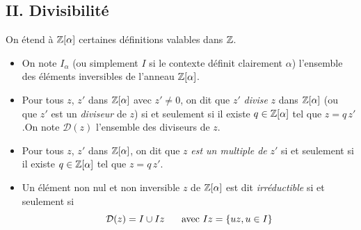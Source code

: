 \subsection*{II. Divisibilité}
On étend à $\mathbb{Z}[\alpha]$ certaines définitions valables dans $\mathbb{Z}$.
\begin{itemize}
  \item On note $I_\alpha$ (ou simplement $I$ si le contexte définit clairement $\alpha$) l'ensemble des éléments inversibles de l'anneau $\mathbb{Z}[\alpha]$.
  \item Pour tous $z$, $z'$ dans $\mathbb{Z}[\alpha]$ avec $z'\neq 0$, on dit que $z'$ \emph{divise} $z$ dans $\mathbb{Z}[\alpha]$ (ou que $z'$ est un \emph{diviseur} de $z$) si et seulement si il existe $q\in \mathbb{Z}[\alpha]$ tel que $z = q\,z'$.\newline On note $\mathcal{D}(z)$ l'ensemble des diviseurs de $z$.
  \item Pour tous $z$, $z'$ dans $\mathbb{Z}[\alpha]$, on dit que $z$ \emph{est un multiple de} $z'$ si et seulement si il existe $q\in \mathbb{Z}[\alpha]$ tel que $z = q\,z'$.
  \item Un élément non nul et non inversible $z$ de $\mathbb{Z}[\alpha]$ est dit \emph{irréductible} si et seulement si
\begin{displaymath}
  \mathcal{D}(z) = I \cup Iz \hspace{0.5cm}\text{ avec } Iz = \left\lbrace uz, u\in I\right\rbrace 
\end{displaymath}
\end{itemize}

